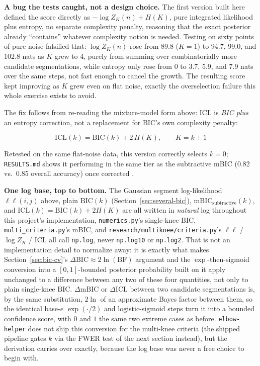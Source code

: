 \documentclass[11pt]{article}
\newcommand{\code}[1]{\texttt{#1}}
\begin{document}
\textbf{A bug the tests caught, not a design choice.} The first version
built here defined the score directly as $-\log Z_K(n) + H(K)$, pure
integrated likelihood plus entropy, no separate complexity penalty,
reasoning that the exact posterior already ``contains'' whatever complexity
notion is needed. Testing on sixty points of pure noise falsified that:
$\log Z_K(n)$ rose from 89.8 ($K=1$) to 94.7, 99.0, and 102.8 nats as $K$
grew to 4, purely from summing over combinatorially more candidate
segmentations, while entropy only rose from 0 to 3.7, 5.9, and 7.9 nats
over the same steps, not fast enough to cancel the growth. The resulting
score kept improving as $K$ grew even on flat noise, exactly the
overselection failure this whole exercise exists to avoid.

The fix follows from re-reading the mixture-model form above: ICL is
\emph{BIC plus} an entropy correction, not a replacement for BIC's own
complexity penalty:

\begin{equation}
\mathrm{ICL}(k) = \mathrm{BIC}(k) + 2\,H(K), \qquad K = k+1
\end{equation}

Retested on the same flat-noise data, this version correctly selects $k =
0$; \code{RESULTS.md} shows it performing in the same tier as the
subtractive mBIC (0.82 vs.\ 0.85 overall accuracy) once corrected
\citep{biernacki2000}.

\textbf{One log base, top to bottom.} The Gaussian segment log-likelihood
$\ell\ell(i,j)$ above, plain $\mathrm{BIC}(k)$ (Section~\ref{sec:several-bic}),
$\mathrm{mBIC}_{\text{subtractive}}(k)$, and $\mathrm{ICL}(k) =
\mathrm{BIC}(k) + 2H(K)$ are all written in \emph{natural} log throughout
this project's implementation, \code{numerics.py}'s single-knee
$\mathrm{BIC}$, \code{multi\_criteria.py}'s $\mathrm{mBIC}$, and
\code{research/multiknee/criteria.py}'s $\ell\ell$ / $\log Z_K$ / ICL all
call \code{np.log}, never \code{np.log10} or \code{np.log2}. That is not
an implementation detail to normalize away: it is exactly what makes
Section~\ref{sec:bic-cv}'s $\Delta\mathrm{BIC} \approx 2\ln(\mathrm{BF})$
argument and the $\exp$-then-sigmoid conversion into a $[0,1]$-bounded
posterior probability built on it apply unchanged to a difference between
any two of these four quantities, not only to plain single-knee
$\mathrm{BIC}$. $\Delta\mathrm{mBIC}$ or $\Delta\mathrm{ICL}$ between two
candidate segmentations is, by the same substitution, $2\ln$ of an
approximate Bayes factor between them, so the identical base-$e$
$\exp(\cdot/2)$ and logistic-sigmoid steps turn it into a bounded
confidence score, with $0$ and $1$ the same two extreme cases as before.
\code{elbow-helper} does not ship this conversion for the multi-knee
criteria (the shipped pipeline gates $k$ via the FWER test of the next
section instead), but the derivation carries over exactly, because the log
base was never a free choice to begin with.
\end{document}
